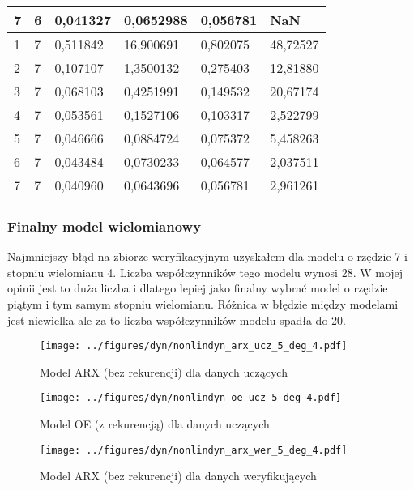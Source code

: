 \documentclass[a4paper,titlepage,11pt,floatssmall]{mwrep}
\begin{document}
\begin{table}[H]
\begin{tabular}{|l|l|l|l|l|l|}
7           & 6             & 0,041327 & 0,0652988 & 0,056781 & NaN      \\ \hline
1           & 7             & 0,511842 & 16,900691 & 0,802075 & 48,72527 \\ \hline
2           & 7             & 0,107107 & 1,3500132 & 0,275403 & 12,81880  \\ \hline
3           & 7             & 0,068103 & 0,4251991 & 0,149532 & 20,67174  \\ \hline
4           & 7             & 0,053561 & 0,1527106 & 0,103317 & 2,522799 \\ \hline
5           & 7             & 0,046666 & 0,0884724 & 0,075372 & 5,458263  \\ \hline
6           & 7             & 0,043484 & 0,0730233 & 0,064577 & 2,037511  \\ \hline
7           & 7             & 0,040960 & 0,0643696 & 0,056781 & 2,961261  \\ \hline
\end{tabular}
\end{table}



\subsubsection{Finalny model wielomianowy}

Najmniejszy błąd na zbiorze weryfikacyjnym uzyskałem dla modelu o rzędzie 7 i stopniu wielomianu 4. Liczba współczynników tego modelu wynosi 28. W mojej opinii jest to duża liczba i dlatego lepiej jako finalny wybrać model o rzędzie piątym i tym samym stopniu wielomianu. Różnica w błędzie między modelami jest niewielka ale za to liczba współczynników modelu spadła do 20.
\bigskip

\begin{figure}[H]
\centering
\texttt{[image: ../figures/dyn/nonlindyn\_arx\_ucz\_5\_deg\_4.pdf]}
\caption{Model ARX (bez rekurencji) dla danych uczących}
\end{figure}
\newpage
\begin{figure}[H]
\centering
\texttt{[image: ../figures/dyn/nonlindyn\_oe\_ucz\_5\_deg\_4.pdf]}
\caption{Model OE (z rekurencją) dla danych uczących}
\end{figure}

\begin{figure}[H]
\centering
\texttt{[image: ../figures/dyn/nonlindyn\_arx\_wer\_5\_deg\_4.pdf]}
\caption{Model ARX (bez rekurencji) dla danych weryfikujących}
\end{figure}
\end{document}
